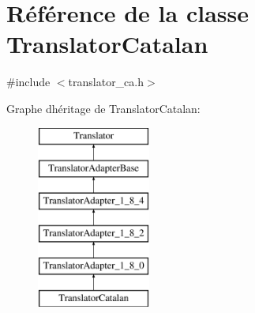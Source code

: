 \hypertarget{class_translator_catalan}{}\section{Référence de la classe Translator\+Catalan}
\label{class_translator_catalan}


{\ttfamily \#include $<$translator\+\_\+ca.\+h$>$}

Graphe d\textquotesingle{}héritage de Translator\+Catalan\+:\begin{figure}[H]
\begin{center}
\leavevmode
\includegraphics[height=6.000000cm]{class_translator_catalan}
\end{center}
\end{figure}
